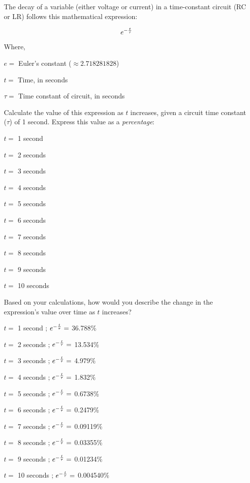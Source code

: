 

The decay of a variable (either voltage or current) in a time-constant circuit (RC or LR) follows this mathematical expression:

$$e^{-{t \over \tau}}$$

\noindent
Where,

$e =$ Euler's constant ($\approx 2.718281828$)

$t =$ Time, in seconds

$\tau =$ Time constant of circuit, in seconds

\vskip 10pt

Calculate the value of this expression as $t$ increases, given a circuit time constant ($\tau$) of 1 second.  Express this value as a {\it percentage}:

\medskip
\item{} $t =$ 1 second
\item{} $t =$ 2 seconds
\item{} $t =$ 3 seconds
\item{} $t =$ 4 seconds
\item{} $t =$ 5 seconds
\item{} $t =$ 6 seconds
\item{} $t =$ 7 seconds
\item{} $t =$ 8 seconds
\item{} $t =$ 9 seconds
\item{} $t =$ 10 seconds
\medskip

Based on your calculations, how would you describe the change in the expression's value over time as $t$ increases?







\medskip
\item{} $t =$ 1 second ; $e^{-{t \over \tau}} =$ 36.788\%
\item{} $t =$ 2 seconds ; $e^{-{t \over \tau}} =$ 13.534\%
\item{} $t =$ 3 seconds ; $e^{-{t \over \tau}} =$ 4.979\%
\item{} $t =$ 4 seconds ; $e^{-{t \over \tau}} =$ 1.832\%
\item{} $t =$ 5 seconds ; $e^{-{t \over \tau}} =$ 0.6738\%
\item{} $t =$ 6 seconds ; $e^{-{t \over \tau}} =$ 0.2479\%
\item{} $t =$ 7 seconds ; $e^{-{t \over \tau}} =$ 0.09119\%
\item{} $t =$ 8 seconds ; $e^{-{t \over \tau}} =$ 0.03355\%
\item{} $t =$ 9 seconds ; $e^{-{t \over \tau}} =$ 0.01234\%
\item{} $t =$ 10 seconds ; $e^{-{t \over \tau}} =$ 0.004540\%
\medskip

